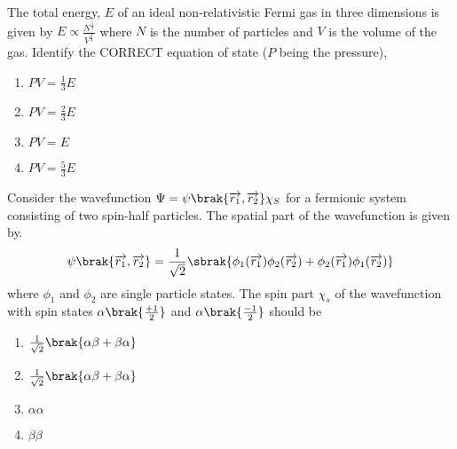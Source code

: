     \item The total energy, $E$ of an ideal non-relativistic Fermi gas in three dimensions is given by $E \propto \frac{N^{\frac{5}{3}}}{V^{\frac{2}{3}}}$ where $N$ is the number of particles and $V$ is the volume of the gas.
    Identify the CORRECT equation of state ($P$ being the pressure),
     \begin{multicols}{4}
        \begin{enumerate}
            \item $PV= \frac{1}{3}E$
            \item $PV= \frac{2}{3}E$
            \item $PV=E$
            \item $PV= \frac{5}{3}E$
        \end{enumerate}
    \end{multicols}

    \item Consider the wavefunction $\Psi=\psi\brak{\overrightarrow{r_1},\overrightarrow{r_2}}\chi_S$ for a fermionic system consisting of two spin-half particles. The spatial part of the wavefunction is given by. 
    \begin{align*}
        \psi \brak{\overrightarrow{r_1},\overrightarrow{r_2}} = \frac{1}{\sqrt{2}} \sbrak{ \phi_1(\overrightarrow{r_1})\phi_2(\overrightarrow{r_2}) + \phi_2(\overrightarrow{r_1})\phi_1(\overrightarrow{r_2})}
    \end{align*}
    where $\phi_1$ and $\phi_2$ are single particle states. The spin part $\chi_s$ of the wavefunction with spin states $\alpha \brak{\frac{+1}{2}}$ and $\alpha \brak{\frac{-1}{2}}$ should be
     \begin{multicols}{4}
        \begin{enumerate}
            \item $\frac{1}{\sqrt{2}} \brak{\alpha \beta + \beta \alpha}$
            \item $\frac{1}{\sqrt{2}} \brak{\alpha \beta + \beta \alpha}$
            \item $\alpha \alpha$
            \item $\beta \beta$
        \end{enumerate}
    \end{multicols}

